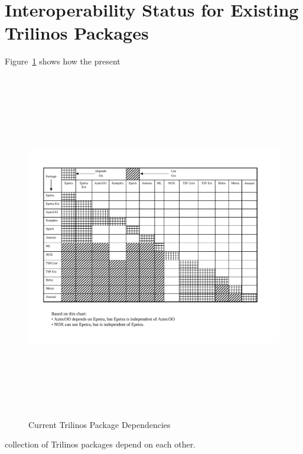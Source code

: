 \documentclass[12pt,relax]{TrilinosDevGuide}
\begin{document}
\section{Interoperability Status for Existing Trilinos Packages}
Figure~\ref{Figure:TrilinosPackageDependencies} shows how the present
\begin{figure}
\includegraphics[height=6in,angle=90]{../CommonFiles/TrilinosPackageDependencies}
\caption{\label{Figure:TrilinosPackageDependencies}Current Trilinos Package Dependencies}
\end{figure}
collection of Trilinos packages depend on each other.


\clearpage

%

\end{document}
